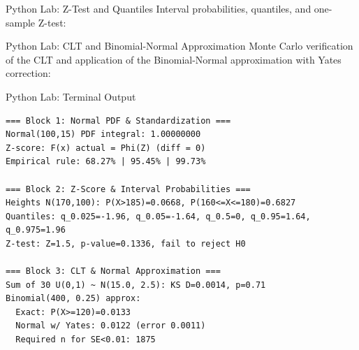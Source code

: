 \documentclass[aspectratio=169,xcolor={dvipsnames,table}]{beamer}
\begin{document}
\begin{frame}[fragile]{Python Lab: Z-Test and Quantiles}
	\vspace{-0.05cm}
	\scriptsize
	Interval probabilities, quantiles, and one-sample Z-test:
	\vspace{0.02cm}
	{
	}
\end{frame}

\begin{frame}[fragile]{Python Lab: CLT and Binomial-Normal Approximation}
	\vspace{-0.05cm}
	\scriptsize
	Monte Carlo verification of the CLT and application of the Binomial-Normal approximation with Yates correction:
	\vspace{0.02cm}
	{
	}
\end{frame}

\begin{frame}[fragile]{Python Lab: Terminal Output}
	\vspace{-0.1cm}
	\begin{block}{}
		\fontsize{4pt}{5pt}\selectfont
		\begin{verbatim}
=== Block 1: Normal PDF & Standardization ===
Normal(100,15) PDF integral: 1.00000000
Z-score: F(x) actual = Phi(Z) (diff = 0)
Empirical rule: 68.27% | 95.45% | 99.73%

=== Block 2: Z-Score & Interval Probabilities ===
Heights N(170,100): P(X>185)=0.0668, P(160<=X<=180)=0.6827
Quantiles: q_0.025=-1.96, q_0.05=-1.64, q_0.5=0, q_0.95=1.64, q_0.975=1.96
Z-test: Z=1.5, p-value=0.1336, fail to reject H0

=== Block 3: CLT & Normal Approximation ===
Sum of 30 U(0,1) ~ N(15.0, 2.5): KS D=0.0014, p=0.71
Binomial(400, 0.25) approx:
  Exact: P(X>=120)=0.0133
  Normal w/ Yates: 0.0122 (error 0.0011)
  Required n for SE<0.01: 1875
		\end{verbatim}
	\end{block}
\end{frame}
\end{document}
